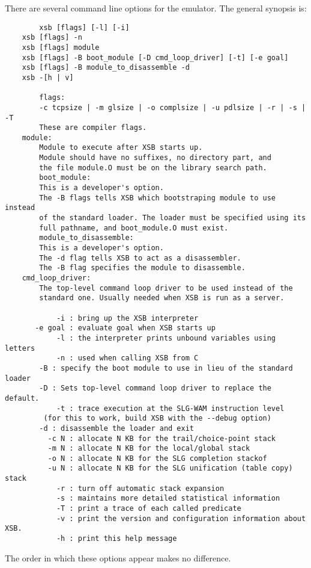 There are several command line options for the emulator. The general 
synopsis is:
\begin{verbatim}
      	xsb [flags] [-l] [-i]
	xsb [flags] -n
	xsb [flags] module
	xsb [flags] -B boot_module [-D cmd_loop_driver] [-t] [-e goal]
	xsb [flags] -B module_to_disassemble -d
	xsb -[h | v]

      	flags:
	    -c tcpsize | -m glsize | -o complsize | -u pdlsize | -r | -s | -T
	    These are compiler flags.
	module:
	    Module to execute after XSB starts up.
	    Module should have no suffixes, no directory part, and
	    the file module.O must be on the library search path.
      	boot_module:
	    This is a developer's option.
	    The -B flags tells XSB which bootstraping module to use instead
	    of the standard loader. The loader must be specified using its
	    full pathname, and boot_module.O must exist.
    	module_to_disassemble:
	    This is a developer's option.
	    The -d flag tells XSB to act as a disassembler.
	    The -B flag specifies the module to disassemble.
	cmd_loop_driver:
	    The top-level command loop driver to be used instead of the
	    standard one. Usually needed when XSB is run as a server.

      	    -i : bring up the XSB interpreter
       -e goal : evaluate goal when XSB starts up
      	    -l : the interpreter prints unbound variables using letters
      	    -n : used when calling XSB from C
	    -B : specify the boot module to use in lieu of the standard loader
	    -D : Sets top-level command loop driver to replace the default.
      	    -t : trace execution at the SLG-WAM instruction level
		 (for this to work, build XSB with the --debug option)
	    -d : disassemble the loader and exit
      	  -c N : allocate N KB for the trail/choice-point stack
      	  -m N : allocate N KB for the local/global stack
      	  -o N : allocate N KB for the SLG completion stackof
      	  -u N : allocate N KB for the SLG unification (table copy) stack
      	    -r : turn off automatic stack expansion
      	    -s : maintains more detailed statistical information
      	    -T : print a trace of each called predicate
      	    -v : print the version and configuration information about XSB.
      	    -h : print this help message

\end{verbatim}
The order in which these options appear makes no difference.


